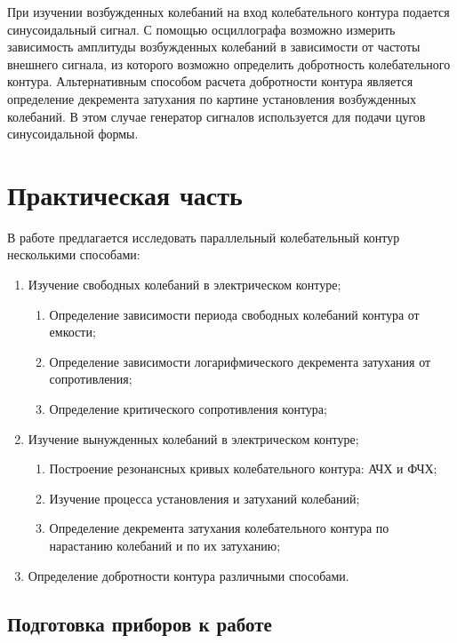 \documentclass[a4paper,12pt]{article} %
\begin{document}
При изучении возбужденных колебаний на вход колебательного контура подается
синусоидальный сигнал. С помощью осциллографа возможно измерить зависимость
амплитуды возбужденных колебаний в зависимости от частоты внешнего сигнала,
из которого возможно определить добротность колебательного контура. Альтернативным способом расчета добротности контура является определение декремента затухания по картине установления возбужденных колебаний. В этом случае генератор сигналов используется для подачи цугов синусоидальной формы.

\section{Практическая часть}

В работе предлагается исследовать параллельный колебательный контур несколькими способами:

\begin{enumerate}
    \item Изучение свободных колебаний в электрическом контуре;
    \begin{enumerate}
        \item Определение зависимости периода свободных колебаний контура от емкости;
        \item Определение зависимости логарифмического декремента затухания от сопротивления;
        \item Определение критического сопротивления контура;
    \end{enumerate}
    \item Изучение вынужденных колебаний в электрическом контуре;
    \begin{enumerate}
        \item Построение резонансных кривых колебательного контура: АЧХ и ФЧХ;
        \item Изучение процесса установления и затуханий колебаний;
        \item Определение декремента затухания колебательного контура по нарастанию колебаний и по их затуханию;
    \end{enumerate}
    \item Определение добротности контура различными способами.
\end{enumerate}

\subsection{Подготовка приборов к работе}
\end{document}
